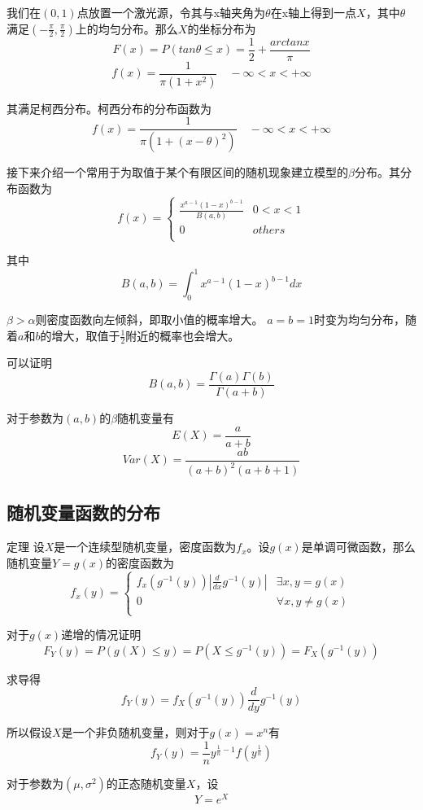 \documentclass[UTF8]{ctexart}
\begin{document}
我们在$(0,1)$点放置一个激光源，令其与x轴夹角为$\theta $在x轴上得到一点$X$，其中$\theta $满足$(-\frac{\pi }{2},\frac{\pi }{2})$上的均匀分布。那么$X$的坐标分布为
$$F(x)=P(tan\theta \leq x)=\frac{1}{2}+\frac{arctanx}{\pi } $$
$$f(x)=\frac{1}{\pi (1+x^{2})}\quad -\infty <x<+\infty $$

其满足柯西分布。柯西分布的分布函数为
$$f(x)=\frac{1}{\pi (1+(x-\theta )^{2})}\quad -\infty <x<+\infty $$

接下来介绍一个常用于为取值于某个有限区间的随机现象建立模型的$\beta $分布。其分布函数为
$$f(x)=\left\{
\begin{array}{ll}
\displaystyle\frac{x^{a-1}(1-x)^{b-1}}{B(a,b)} &0<x<1\\
0 &others\\
\end{array}
\right. $$

其中
$$B(a,b)=\int_{0}^{1}x^{a-1}(1-x)^{b-1}dx $$

$\beta >\alpha $则密度函数向左倾斜，即取小值的概率增大。
$a=b=1$时变为均匀分布，随着$a$和$b$的增大，取值于$\frac{1}{2}$附近的概率也会增大。

可以证明
$$B(a,b)=\frac{\Gamma (a)\Gamma (b)}{\Gamma (a+b)} $$

对于参数为$(a,b)$的$\beta $随机变量有
$$E(X)=\frac{a}{a+b} $$
$$Var(X)=\frac{ab}{(a+b)^{2}(a+b+1)} $$

\subsection{随机变量函数的分布}

定理 设$X$是一个连续型随机变量，密度函数为$f_{x}$。设$g(x)$是单调可微函数，那么随机变量$Y=g(x)$的密度函数为
$$f_{x}(y)=\left\{
\begin{array}{ll}
f_{x}(g^{-1}(y))|\displaystyle\frac{d}{dx}g^{-1}(y)| &\exists x,y=g(x)\\
0 &\forall x,y\neq g(x)\\
\end{array}
\right. $$

对于$g(x)$递增的情况证明
$$F_{Y}(y)=P(g(X)\leq y)=P(X\leq g^{-1}(y))=F_{X}(g^{-1}(y)) $$

求导得
$$f_{Y}(y)=f_{X}(g^{-1}(y))\displaystyle\frac{d}{dy}g^{-1}(y) $$

所以假设$X$是一个非负随机变量，则对于$g(x)=x^{n} $有
$$f_{Y}(y)=\frac{1}{n}y^{\frac{1}{n} -1}f(y^{\frac{1}{n}}) $$

对于参数为$(\mu ,\sigma^{2}) $的正态随机变量$X$，设
$$Y=e^{X}$$
\end{document}
